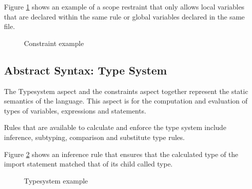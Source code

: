 Figure \ref{fig:constraint_example} shows an example of a scope restraint that only allows local variables that are declared within the same rule or global variables declared in the same file.

\begin{figure}[h]
    \centering
    \caption{Constraint example}
    \label{fig:constraint_example}
\end{figure}
 
\subsection{Abstract Syntax: Type System}
The Typesystem aspect and the constraints aspect together represent the static semantics of the language.
This aspect is for the computation and evaluation of types of variables, expressions and statements.

Rules that are available to calculate and enforce the type system include inference, subtyping, comparison and substitute type rules.

Figure \ref{fig:typesystem_example} shows an inference rule that ensures that the calculated type of the import statement matched that of its child called type.

\begin{figure}[h]
    \centering
    \caption{Typesystem example}
    \label{fig:typesystem_example}
\end{figure}
 

